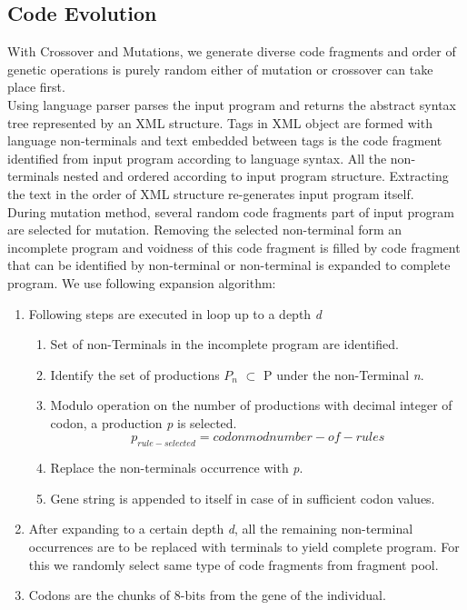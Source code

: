 \documentclass{acm_proc_article-sp}
\begin{document}
\subsection{Code Evolution} \label{cgen}
With Crossover and Mutations, we generate diverse code fragments and order of genetic operations is purely random either of mutation or crossover can take place first. \\ 
\indent Using language parser parses the input program and returns the abstract syntax tree represented by an XML structure. Tags in XML object are formed with language non-terminals and text embedded between tags is the code fragment identified from input program according to language syntax. All the non-terminals nested and ordered according to input program structure. Extracting the text in the order of XML structure re-generates input program itself. \\
\indent During mutation method, several random code fragments part of input program are selected for mutation. Removing the selected non-terminal form an incomplete program and voidness of this code fragment is filled by code fragment that can be identified by non-terminal or non-terminal is expanded to complete program. We use following expansion algorithm:

\begin{enumerate}
\item Following steps are executed in loop up to a depth \textit{d}
\begin{enumerate}
\item Set of non-Terminals in the incomplete program are identified.
\item Identify the set of productions $P_{n}$ $\subset$ P under the non-Terminal \textit{n}.
\item Modulo operation on the number of productions with decimal integer of codon, a production \textit{p} is selected. 
\[p_{rule-selected} = codon mod number-of-rules\]
\item Replace the non-terminals occurrence with \textit{p}.
\item Gene string is appended to itself in case of in sufficient codon values.
\end{enumerate}
\item After expanding to a certain depth \textit{d}, all the remaining non-terminal occurrences are to be replaced with terminals to yield complete program. For this we randomly select same type of code fragments from fragment pool.
\item[] Codons are the chunks of 8-bits from the gene of the individual.
\end{enumerate}
\end{document}
